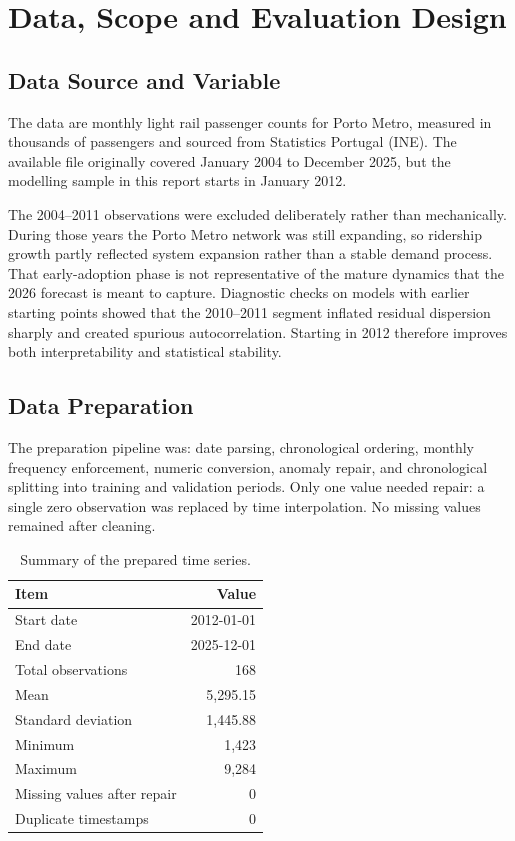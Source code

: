 \documentclass[runningheads]{llncs}
\begin{document}
\section{Data, Scope and Evaluation Design}

\subsection{Data Source and Variable}
The data are monthly light rail passenger counts for Porto Metro, measured in thousands of passengers and sourced from Statistics Portugal (INE). The available file originally covered January 2004 to December 2025, but the modelling sample in this report starts in January 2012.

The 2004--2011 observations were excluded deliberately rather than mechanically. During those years the Porto Metro network was still expanding, so ridership growth partly reflected system expansion rather than a stable demand process. That early-adoption phase is not representative of the mature dynamics that the 2026 forecast is meant to capture. Diagnostic checks on models with earlier starting points showed that the 2010--2011 segment inflated residual dispersion sharply and created spurious autocorrelation. Starting in 2012 therefore improves both interpretability and statistical stability.

\subsection{Data Preparation}
The preparation pipeline was: date parsing, chronological ordering, monthly frequency enforcement, numeric conversion, anomaly repair, and chronological splitting into training and validation periods. Only one value needed repair: a single zero observation was replaced by time interpolation. No missing values remained after cleaning.

\begin{table}[tbp]
\caption{Summary of the prepared time series.}
\label{tab:data_summary}
\centering
\begin{tabular}{lr}
\toprule
Item & Value \\
\midrule
Start date & 2012-01-01 \\
End date & 2025-12-01 \\
Total observations & 168 \\
Mean & 5,295.15 \\
Standard deviation & 1,445.88 \\
Minimum & 1,423 \\
Maximum & 9,284 \\
Missing values after repair & 0 \\
Duplicate timestamps & 0 \\
\bottomrule
\end{tabular}
\end{table}
\end{document}
